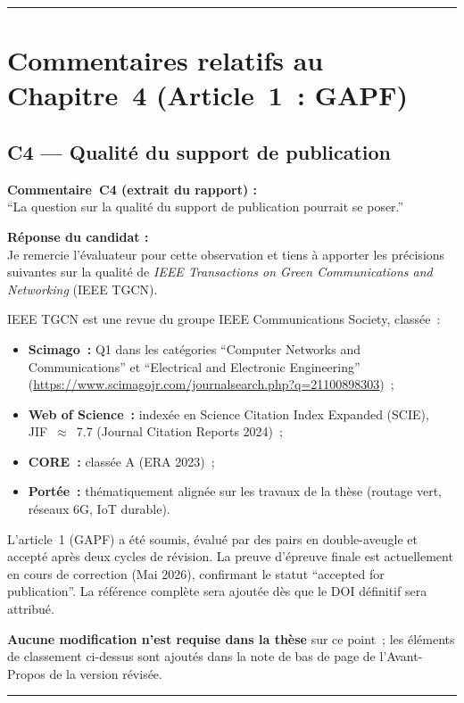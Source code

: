 \documentclass[12pt,a4paper]{article}
\newcommand{\Commentaire}[2]{%
  \begin{reviewerbox}
    \textbf{Commentaire~#1 (extrait du rapport) :}\\#2
  \end{reviewerbox}%
}
\newcommand{\Reponse}[1]{%
  \begin{responsebox}
    \textbf{Réponse du candidat :}\\#1
  \end{responsebox}%
}
\begin{document}
\bigskip
\hrule
\bigskip

\section*{Commentaires relatifs au Chapitre~4 (Article~1~: GAPF)}

\subsection*{C4 --- Qualité du support de publication}

\Commentaire{C4}{
  ``La question sur la qualité du support de publication pourrait se poser.''
}

\Reponse{
Je remercie l'évaluateur pour cette observation et tiens à apporter les précisions suivantes sur la qualité de \emph{IEEE Transactions on Green Communications and Networking} (IEEE TGCN).

IEEE TGCN est une revue du groupe IEEE Communications Society, classée~:
\begin{itemize}[leftmargin=*]
  \item \textbf{Scimago~:} Q1 dans les catégories ``Computer Networks and Communications'' et ``Electrical and Electronic Engineering'' (\url{https://www.scimagojr.com/journalsearch.php?q=21100898303})~;
  \item \textbf{Web of Science~:} indexée en Science Citation Index Expanded (SCIE), JIF~$\approx$~7.7 (Journal Citation Reports 2024)~;
  \item \textbf{CORE~:} classée A (ERA 2023)~;
  \item \textbf{Portée~:} thématiquement alignée sur les travaux de la thèse (routage vert, réseaux 6G, IoT durable).
\end{itemize}

L'article~1 (GAPF) a été soumis, évalué par des pairs en double-aveugle et accepté après deux cycles de révision. La preuve d'épreuve finale est actuellement en cours de correction (Mai 2026), confirmant le statut ``accepted for publication''. La référence complète sera ajoutée dès que le DOI définitif sera attribué.

\textbf{Aucune modification n'est requise dans la thèse} sur ce point~; les éléments de classement ci-dessus sont ajoutés dans la note de bas de page de l'Avant-Propos de la version révisée.
}

\bigskip
\hrule
\bigskip

\end{document}

